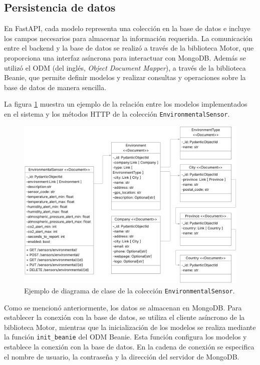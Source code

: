 \subsection{Persistencia de datos}

En FastAPI, cada modelo representa una colección en la base de datos e incluye
los campos necesarios para almacenar la información requerida. La comunicación
entre el backend y la base de datos se realizó a través de la biblioteca Motor,
que proporciona una interfaz asíncrona para interactuar con MongoDB. Además se
utilizó el ODM (del inglés, \textit{Object Document Mapper}), a través de la
biblioteca Beanie, que permite definir modelos y realizar consultas y
operaciones sobre la base de datos de manera sencilla.

La figura \ref{fig:diagrama de clases} muestra un ejemplo de la relación entre
los modelos implementados en el sistema y los métodos HTTP de la colección
\texttt{EnvironmentalSensor}.

\begin{figure}[H]
    \centering
    \includegraphics[width=.88\textwidth]{./Images/18.png}
    \caption{Ejemplo de diagrama de clase de la colección \texttt{EnvironmentalSensor}.}
    \label{fig:diagrama de clases}
\end{figure}

Como se mencionó anteriormente, los datos se almacenan en MongoDB. Para
establecer la conexión con la base de datos, se utiliza el cliente asíncrono de
la biblioteca Motor, mientras que la inicialización de los modelos se realiza
mediante la función \texttt{init\_beanie} del ODM Beanie. Esta función
configura los modelos y establece la conexión con la base de datos. En la
cadena de conexión se especifica el nombre de usuario, la contraseña y la
dirección del servidor de MongoDB.


